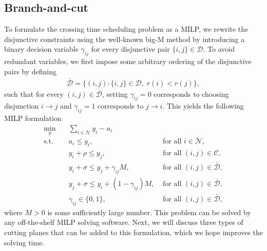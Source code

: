 \documentclass[a4paper]{report}
\theoremstyle{definition}
\theoremstyle{plain}
\begin{document}
\subsection{Branch-and-cut}

To formulate the crossing time scheduling problem as a MILP, we rewrite the
disjunctive constraints using the well-known big-M method by introducing a
binary decision variable $\gamma_{ij}$ for every disjunctive pair
$\{i, j\} \in \mathcal{D}$.
%
To avoid redundant variables, we first impose some arbitrary ordering of the
disjunctive pairs by defining
\begin{align*}
  \bar{\mathcal{D}} = \{ (i,j) : \{i,j\} \in \mathcal{D}, \; r(i) < r(j) \} ,
\end{align*}
such that for every $(i,j) \in \bar{\mathcal{D}}$, setting $\gamma_{ij} = 0$
corresponds to choosing disjunction $i \rightarrow j$ and $\gamma_{ij} = 1$ corresponds to
$j \rightarrow i$. This yields the following MILP formulation
%
\begin{align*}
  \min_{y} \quad & \sum_{i \in \mathcal{N}} y_{i} - a_{i} & \\
  \text{s.t.} \quad & a_{i} \leq y_{i} , & \text{ for all } i \in \mathcal{N} , \\
  & y_{i} + \rho \leq y_{j} , & \text{ for all } (i,j) \in \mathcal{C} , \\
  & y_{i} + \sigma \leq y_{j} + \gamma_{ij}M , & \text{ for all } (i,j) \in \bar{\mathcal{D}} , \\
  & y_{j} + \sigma \leq y_{i} + (1 - \gamma_{ij})M , & \text{ for all } (i,j) \in \bar{\mathcal{D}} , \\
  & \gamma_{ij} \in \{0, 1\} , & \text{ for all } (i,j) \in \bar{\mathcal{D}} ,
\end{align*}
where $M > 0$ is some sufficiently large number. This problem can be solved by
any off-the-shelf MILP solving software. Next, we will discuss three types of
cutting planes that can be added to this formulation, which we hope improves the
solving time.
\end{document}
